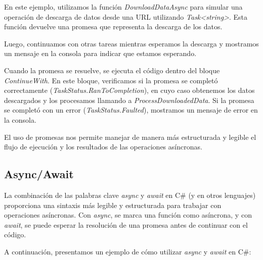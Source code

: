 \documentclass[executivepaper]{article}
\begin{document}
En este ejemplo, utilizamos la función \emph{DownloadDataAsync} para simular una operación de descarga de datos desde una URL utilizando \emph{Task<string>}. Esta función devuelve una promesa que representa la descarga de los datos.

Luego, continuamos con otras tareas mientras esperamos la descarga y mostramos un mensaje en la consola para indicar que estamos esperando.

Cuando la promesa se resuelve, se ejecuta el código dentro del bloque \emph{ContinueWith}. En este bloque, verificamos si la promesa se completó correctamente (\emph{TaskStatus.RanToCompletion}), en cuyo caso obtenemos los datos descargados y los procesamos llamando a \emph{ProcessDownloadedData}. Si la promesa se completó con un error (\emph{TaskStatus.Faulted}), mostramos un mensaje de error en la consola.

El uso de promesas nos permite manejar de manera más estructurada y legible el flujo de ejecución y los resultados de las operaciones asíncronas.    

\subsection{Async/Await}

La combinación de las palabras clave \emph{async} y \emph{await} en C\# (y en otros lenguajes) proporciona una sintaxis más legible y estructurada para trabajar con operaciones asíncronas. Con \emph{async}, se marca una función como asíncrona, y con \emph{await}, se puede esperar la resolución de una promesa antes de continuar con el código.

A continuación, presentamos un ejemplo de cómo utilizar \emph{async} y \emph{await} en C\#:
\end{document}
